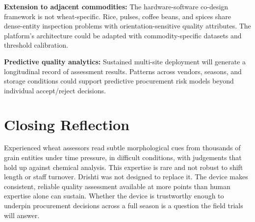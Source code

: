 \textbf{Extension to adjacent commodities:} The hardware-software co-design framework is not wheat-specific. Rice, pulses, coffee beans, and spices share dense-entity inspection problems with orientation-sensitive quality attributes. The platform's architecture could be adapted with commodity-specific datasets and threshold calibration.

\textbf{Predictive quality analytics:} Sustained multi-site deployment will generate a longitudinal record of assessment results. Patterns across vendors, seasons, and storage conditions could support predictive procurement risk models beyond individual accept/reject decisions.

\section{Closing Reflection}

Experienced wheat assessors read subtle morphological cues from thousands of grain entities under time pressure, in difficult conditions, with judgements that hold up against chemical analysis. This expertise is rare and not robust to shift length or staff turnover. Drishti was not designed to replace it. The device makes consistent, reliable quality assessment available at more points than human expertise alone can sustain. Whether the device is trustworthy enough to underpin procurement decisions across a full season is a question the field trials will answer.
